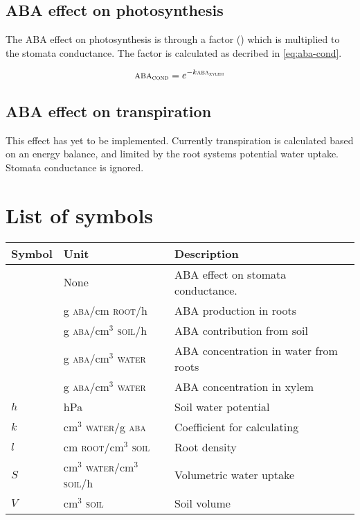 \documentclass[a4paper,11pt,twoside]{article}
\newcommand{\aba}[1]{\text{\textsc{aba}$_\text{\textsc{#1}}$}}
\begin{document}
\subsection{ABA effect on photosynthesis}

The ABA effect on photosynthesis is through a factor (\aba{cond})
which is multiplied to the stomata conductance.  The factor is
calculated as decribed in \eqref{eq:aba-cond}.

\begin{equation}
  \aba{cond} = e^{-k \aba{xylem}}
  \label{eq:aba-cond}
\end{equation}

\subsection{ABA effect on transpiration}

This effect has yet to be implemented.  Currently transpiration is
calculated based on an energy balance, and limited by the root systems
potential water uptake.  Stomata conductance is ignored.

\section{List of symbols}

\begin{tabular}{lll}
  Symbol & Unit & Description\\\hline
  \aba{cond} & None
    & ABA effect on stomata conductance.\\
  \aba{root} & g \textsc{aba}/cm \textsc{root}/h
    & ABA production in roots\\
  \aba{soil} & g \textsc{aba}/cm$^3$ \textsc{soil}/h
    & ABA contribution from soil\\
  \aba{uptake} & g \textsc{aba}/cm$^3$ \textsc{water}
    & ABA concentration in water from roots\\
  \aba{xylem} & g \textsc{aba}/cm$^3$ \textsc{water}
    & ABA concentration in xylem\\
  $h$    & hPa              
    & Soil water potential\\
  $k$    & cm$^3$ \textsc{water}/g \textsc{aba}
    & Coefficient for calculating \aba{cond}\\
  $l$    & cm \textsc{root}/cm$^3$ \textsc{soil} 
    & Root density\\
  $S$    & cm$^3$ \textsc{water}/cm$^3$ \textsc{soil}/h
    & Volumetric water uptake\\
  $V$    & cm$^3$ \textsc{soil}
    & Soil volume\\
\end{tabular}
\end{document}
